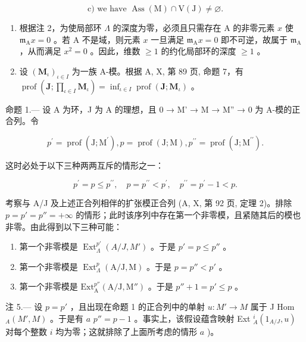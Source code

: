 \[
\mathrm{c)} \text {   we have   } \operatorname{Ass} (\mathrm{M}) \cap \mathrm{V} (\mathrm{J}) \neq \varnothing .
\]

\begin{enumerate}
\def\labelenumi{\arabic{enumi})}
\setcounter{enumi}{2}
\item
  根据注 2，为使局部环 \(\Lambda\) 的深度为零，必须且只需存在 A 的非零元素 \(x\) 使 \(\mathfrak{m}_{\mathrm{A}}x = 0\) 。若 A 不是域，则元素 \(x\) 一旦满足 \(\mathfrak{m}_{\mathrm{A}}x = 0\) 即不可逆，故属于 \(\mathfrak{m}_{\mathrm{A}}\) ，从而满足 \(x^{2} = 0\) 。因此，维数 \(\geqslant 1\) 的约化局部环的深度 \(\geqslant 1\) 。
\item
  设 \((\mathbf{M}_{\iota})_{\iota \in I}\) 为一族 A-模。根据 A, X, 第 89 页, 命题 7，有 \(\operatorname{prof}(\mathbf{J};\prod_{\iota \in I}\mathbf{M}_{\iota}) = \inf_{\iota \in I}\operatorname{prof}(\mathbf{J};\mathbf{M}_{\iota})\) 。
\end{enumerate}

命题 1.--- 设 A 为环，J 为 A 的理想，且 0 → M' → M → M'' → 0 为 A-模的正合列。令

\[
p ^ {\prime} = \operatorname{prof} (\mathrm{J}; \mathrm{M} ^ {\prime}), p = \operatorname{prof} (\mathrm{J}; \mathrm{M}), p ^ {\prime \prime} = \operatorname{prof} (\mathrm{J}; \mathrm{M} ^ {\prime \prime}).
\]

这时必处于以下三种两两互斥的情形之一：

\[
p ^ {\prime} = p \leqslant p ^ {\prime \prime}, \quad p = p ^ {\prime \prime} <   p ^ {\prime}, \quad p ^ {\prime \prime} = p ^ {\prime} - 1 <   p.
\]

考察与 A/J 及上述正合列相伴的扩张模正合列 (A, X, 第 92 页, 定理 2)。排除 \(p = p' = p'' = +\infty\) 的情形；此时该序列中存在第一个非零模，且紧随其后的模也非零。由此得到以下三种可能：

\begin{enumerate}
\def\labelenumi{\alph{enumi})}
\item
  第一个非零模是 \(\operatorname{Ext}_{\Lambda}^{p'}(A/J, M')\) 。于是 \(p' = p \leqslant p''\) 。
\item
  第一个非零模是 \(\operatorname{Ext}_{\Lambda}^{p}(\mathrm{A} / \mathrm{J},\mathrm{M})\) 。于是 \(p = p'' < p'\) 。
\item
  第一个非零模是 \(\mathrm{Ext}_{\mathrm{A}}^{p''}(\mathrm{A} / \mathrm{J},\mathrm{M}'')\) 。于是 \(p'' + 1 = p' \leqslant p\) 。
\end{enumerate}

注 5.--- 设 \(p = p'\) ，且出现在命题 1 的正合列中的单射 \(u: M' \to M\) 属于 J Hom \(_A(M', M)\) 。于是有 \(a\) \(p'' = p - 1\) 。事实上，该假设蕴含映射 Ext \(_A^i(1_{A/J}, u)\) 对每个整数 \(i\) 均为零；这就排除了上面所考虑的情形 \(a\) )。

